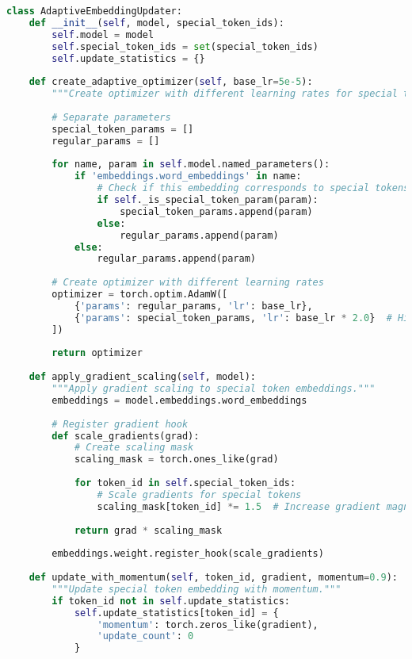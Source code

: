 \begin{lstlisting}[language=Python, caption=Adaptive embedding update strategies]
class AdaptiveEmbeddingUpdater:
    def __init__(self, model, special_token_ids):
        self.model = model
        self.special_token_ids = set(special_token_ids)
        self.update_statistics = {}
        
    def create_adaptive_optimizer(self, base_lr=5e-5):
        """Create optimizer with different learning rates for special tokens."""
        
        # Separate parameters
        special_token_params = []
        regular_params = []
        
        for name, param in self.model.named_parameters():
            if 'embeddings.word_embeddings' in name:
                # Check if this embedding corresponds to special tokens
                if self._is_special_token_param(param):
                    special_token_params.append(param)
                else:
                    regular_params.append(param)
            else:
                regular_params.append(param)
                
        # Create optimizer with different learning rates
        optimizer = torch.optim.AdamW([
            {'params': regular_params, 'lr': base_lr},
            {'params': special_token_params, 'lr': base_lr * 2.0}  # Higher LR for special tokens
        ])
        
        return optimizer
        
    def apply_gradient_scaling(self, model):
        """Apply gradient scaling to special token embeddings."""
        embeddings = model.embeddings.word_embeddings
        
        # Register gradient hook
        def scale_gradients(grad):
            # Create scaling mask
            scaling_mask = torch.ones_like(grad)
            
            for token_id in self.special_token_ids:
                # Scale gradients for special tokens
                scaling_mask[token_id] *= 1.5  # Increase gradient magnitude
                
            return grad * scaling_mask
            
        embeddings.weight.register_hook(scale_gradients)
        
    def update_with_momentum(self, token_id, gradient, momentum=0.9):
        """Update special token embedding with momentum."""
        if token_id not in self.update_statistics:
            self.update_statistics[token_id] = {
                'momentum': torch.zeros_like(gradient),
                'update_count': 0
            }
            

\end{lstlisting}
